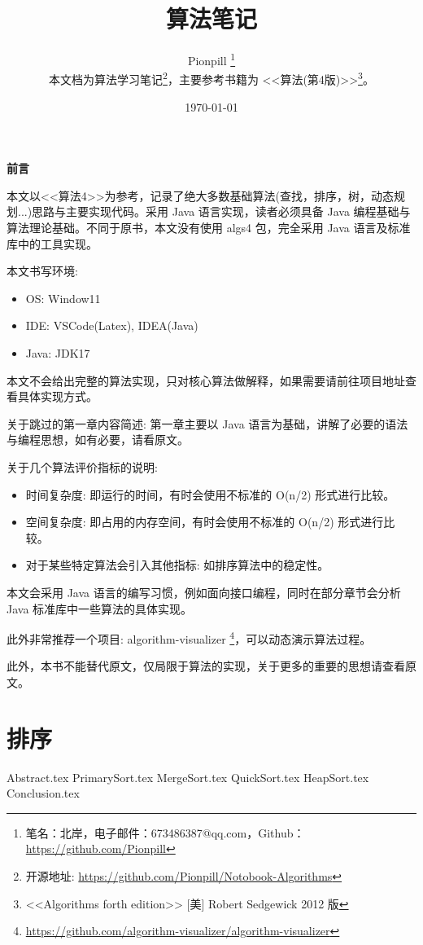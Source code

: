 \documentclass{PionpillNote-book}
\title{算法笔记}
\author{
    Pionpill \footnote{笔名：北岸，电子邮件：673486387@qq.com，Github：\url{https://github.com/Pionpill}} \\
    本文档为算法学习笔记\footnote{开源地址: \url{https://github.com/Pionpill/Notobook-Algorithms}}，主要参考书籍为 <<算法(第4版)>>\footnote{<<Algorithms forth edition>> [美] Robert Sedgewick 2012 版}。
}
\date{\today}
\begin{document}
\pagestyle{plain}
\maketitle

\noindent\textbf{前言}

本文以<<算法4>>为参考，记录了绝大多数基础算法(查找，排序，树，动态规划...)思路与主要实现代码。采用 Java 语言实现，读者必须具备 Java 编程基础与算法理论基础。不同于原书，本文没有使用 algs4 包，完全采用 Java 语言及标准库中的工具实现。

本文书写环境:
\begin{itemize}
    \item OS: Window11
    \item IDE: VSCode(Latex), IDEA(Java)
    \item Java: JDK17
\end{itemize}

本文不会给出完整的算法实现，只对核心算法做解释，如果需要请前往项目地址查看具体实现方式。

关于跳过的第一章内容简述: 第一章主要以 Java 语言为基础，讲解了必要的语法与编程思想，如有必要，请看原文。

关于几个算法评价指标的说明:

\begin{itemize}
    \item 时间复杂度: 即运行的时间，有时会使用不标准的 O(n/2) 形式进行比较。
    \item 空间复杂度: 即占用的内存空间，有时会使用不标准的 O(n/2) 形式进行比较。
    \item 对于某些特定算法会引入其他指标: 如排序算法中的稳定性。
\end{itemize}

本文会采用 Java 语言的编写习惯，例如面向接口编程，同时在部分章节会分析 Java 标准库中一些算法的具体实现。

此外非常推荐一个项目: algorithm-visualizer
\footnote{\url{https://github.com/algorithm-visualizer/algorithm-visualizer}}，可以动态演示算法过程。

此外，本书不能替代原文，仅局限于算法的实现，关于更多的重要的思想请查看原文。

\newpage

\tableofcontents

\newpage

\setcounter{page}{1} 
\pagestyle{fancy}

\chapter{排序}
{Abstract.tex}
{PrimarySort.tex}
{MergeSort.tex}
{QuickSort.tex}
{HeapSort.tex}
{Conclusion.tex}
\end{document}
